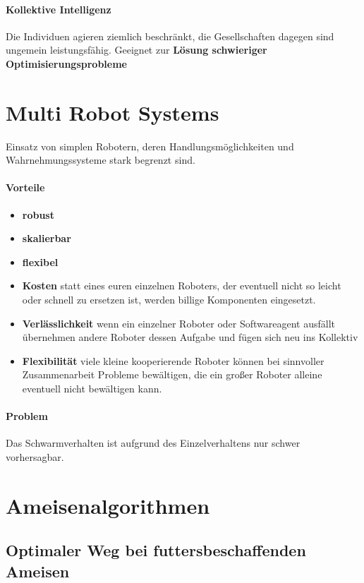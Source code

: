 \paragraph{Kollektive Intelligenz} Die Individuen agieren ziemlich beschränkt, die Gesellschaften dagegen sind ungemein leistungsfähig.
Geeignet zur \textbf{Lösung schwieriger Optimisierungsprobleme}
\section{Multi Robot Systems}
Einsatz von simplen Robotern, deren Handlungsmöglichkeiten und Wahrnehmungssysteme stark begrenzt sind.
\paragraph{Vorteile}
\begin{itemize}
	\item \textbf{robust}
	\item \textbf{skalierbar}
	\item \textbf{flexibel}
	\item \textbf{Kosten} statt eines euren einzelnen Roboters, der eventuell nicht so leicht oder schnell zu ersetzen ist, werden billige Komponenten eingesetzt.
	\item \textbf{Verlässlichkeit} wenn ein einzelner Roboter oder Softwareagent ausfällt übernehmen andere Roboter dessen Aufgabe und fügen sich neu ins Kollektiv
	\item \textbf{Flexibilität} viele kleine kooperierende Roboter können bei sinnvoller Zusammenarbeit Probleme bewältigen, die ein großer Roboter alleine eventuell nicht bewältigen kann.
\end{itemize}
\paragraph{Problem} Das Schwarmverhalten ist aufgrund des Einzelverhaltens nur schwer vorhersagbar.
\section{Ameisenalgorithmen}
\subsection{Optimaler Weg bei futtersbeschaffenden Ameisen}
